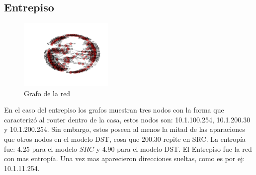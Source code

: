 ~

\subsection{Entrepiso}

\begin{figure}
\vspace{-35pt}
\hspace{-35pt}
\centering
   \includegraphics[width=0.4\textwidth]{resultados/entrepiso/conectividadNX.pdf}
\vspace{-30pt}
   \caption{Grafo de la red}
\end{figure}

En el caso del entrepiso los grafos muestran tres nodos con la forma que caracteriz\'o 
al router dentro de la casa, estos nodos son: 10.1.100.254, 10.1.200.30 y 10.1.200.254.
Sin embargo, estos poseen al menos la mitad de las aparaciones que otros nodos en 
el modelo DST, cosa que $200.30$ repite en SRC. La entrop\'ia fue: $4.25$ para el
modelo $SRC$ y $4.90$ para el modelo DST. El Entrepiso fue la red con mas entrop\'ia.
Una vez mas aparecieron direcciones sueltas, como es por ej: 10.1.11.254.

